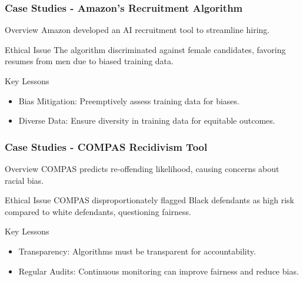 \documentclass{beamer}
\begin{document}
\begin{frame}[fragile]
    \frametitle{Case Studies - Amazon's Recruitment Algorithm}
    \begin{block}{Overview}
        Amazon developed an AI recruitment tool to streamline hiring.
    \end{block}
    \begin{block}{Ethical Issue}
        The algorithm discriminated against female candidates, favoring resumes from men due to biased training data.
    \end{block}
    \begin{block}{Key Lessons}
        \begin{itemize}
            \item Bias Mitigation: Preemptively assess training data for biases.
            \item Diverse Data: Ensure diversity in training data for equitable outcomes.
        \end{itemize}
    \end{block}
\end{frame}

\begin{frame}[fragile]
    \frametitle{Case Studies - COMPAS Recidivism Tool}
    \begin{block}{Overview}
        COMPAS predicts re-offending likelihood, causing concerns about racial bias.
    \end{block}
    \begin{block}{Ethical Issue}
        COMPAS disproportionately flagged Black defendants as high risk compared to white defendants, questioning fairness.
    \end{block}
    \begin{block}{Key Lessons}
        \begin{itemize}
            \item Transparency: Algorithms must be transparent for accountability.
            \item Regular Audits: Continuous monitoring can improve fairness and reduce bias.
        \end{itemize}
    \end{block}
\end{frame}
\end{document}
